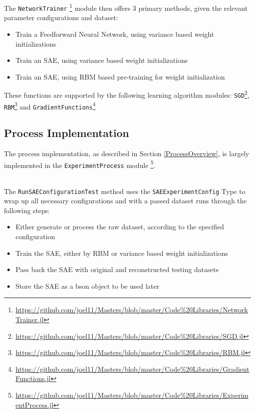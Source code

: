 \documentclass[a4paper,11pt,oneside]{article}
\theoremstyle{plain}
\theoremstyle{definition}
\begin{document}
	The \texttt{NetworkTrainer} \footnote{\url{https://github.com/joel11/Masters/blob/master/Code\%20Libraries/NetworkTrainer.jl}} module then offers 3 primary methods, given the relevant parameter configurations and dataset:
	
	\begin{itemize}
		\item[1] Train a Feedforward Neural Network, using variance based weight initializations 
		\item[2] Train an SAE, using variance based weight initializations
		\item[3] Train an SAE, using RBM based pre-training for weight initialization
	\end{itemize}
	
	These functions are supported by the following learning algorithm modules: \texttt{SGD}\footnote{\url{https://github.com/joel11/Masters/blob/master/Code\%20Libraries/SGD.jl}}, \texttt{RBM}\footnote{\url{https://github.com/joel11/Masters/blob/master/Code\%20Libraries/RBM.jl}} and  \texttt{GradientFunctions}\footnote{\url{https://github.com/joel11/Masters/blob/master/Code\%20Libraries/GradientFunctions.jl}}
	
	\subsection{Process Implementation}
	
	The process implementation, as described in Section \ref{ProcessOverview}, is largely implemented in the \texttt{ExperimentProcess} module \footnote{\url{https://github.com/joel11/Masters/blob/master/Code\%20Libraries/ExperimentProcess.jl}}.
	
	~\\
	The \texttt{RunSAEConfigurationTest} method uses the \texttt{SAEExperimentConfig} Type to wrap up all necessary configurations and with a passed dataset runs through the following steps:
	\begin{itemize}
		\item[1] Either generate or process the raw dataset, according to the specified configuration
		\item[2] Train the SAE, either by RBM or variance based weight initializations
		\item[3] Pass back the SAE with original and reconstructed testing datasets
		\item[4] Store the SAE as a bson object to be used later
	\end{itemize}
	
\end{document}
